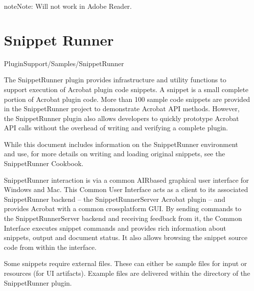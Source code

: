\documentclass[letterpaper,12pt,english,openany,oneside]{sphinxmanual}
\begin{document}
\begin{sphinxadmonition}{note}{Note:}
Will not work in Adobe Reader.
\end{sphinxadmonition}


\section{Snippet Runner}
\label{\detokenize{Samples_Plug_in:snippet-runner}}\label{\detokenize{Samples_Plug_in:location-9}}

PluginSupport/Samples/SnippetRunner

\label{\detokenize{Samples_Plug_in:description-10}}

The SnippetRunner plugin provides infrastructure and utility functions to support execution of Acrobat plugin code snippets. A snippet is a small complete portion of Acrobat plugin code. More than 100 sample code snippets are provided in the SnippetRunner project to demonstrate Acrobat API methods. However, the SnippetRunner plugin also allows developers to quickly prototype Acrobat API calls without the overhead of writing and verifying a complete plugin.

While this document includes information on the SnippetRunner environment and use, for more details on writing and loading original snippets, see the SnippetRunner Cookbook.

\label{\detokenize{Samples_Plug_in:implementation-details-3}}

SnippetRunner interaction is via a common AIR\sphinxhyphen{}based graphical user interface for Windows and Mac. This Common User Interface acts as a client to its associated SnippetRunner back\sphinxhyphen{}end – the SnippetRunnerServer Acrobat plugin – and provides Acrobat with a common cross\sphinxhyphen{}platform GUI. By sending commands to the SnippetRunnerServer back\sphinxhyphen{}end and receiving feedback from it, the Common Interface executes snippet commands and provides rich information about snippets, output and document status. It also allows browsing the snippet source code from within the interface.

\noindent{}
\label{\detokenize{Samples_Plug_in:usage-8}}

Some snippets require external files. These can either be sample files for input or resources (for UI artifacts). Example files are delivered within the  directory of the SnippetRunner plugin.
\end{document}
